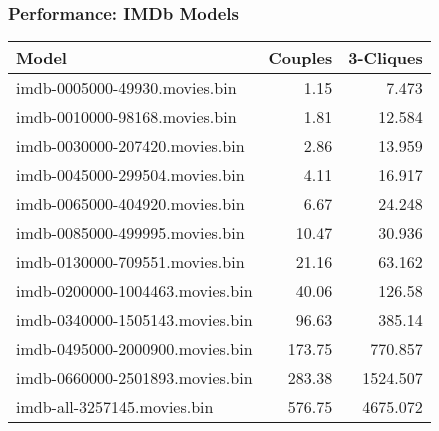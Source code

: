 \documentclass{beamer}
\begin{document}
\begin{frame}
  \frametitle{Performance: IMDb Models}
  \begin{table}
    \centering
    \begin{tabular}{| l | r | r |}
      \hline
      \textbf{Model}                  & \textbf{Couples} & \textbf{3-Cliques}\\
      \hline
      imdb-0005000-49930.movies.bin   & 1.15      & 7.473   \\
      imdb-0010000-98168.movies.bin   & 1.81      & 12.584  \\
      imdb-0030000-207420.movies.bin  & 2.86      & 13.959  \\
      imdb-0045000-299504.movies.bin  & 4.11      & 16.917  \\
      imdb-0065000-404920.movies.bin  & 6.67      & 24.248  \\
      imdb-0085000-499995.movies.bin  & 10.47     & 30.936  \\
      imdb-0130000-709551.movies.bin  & 21.16     & 63.162  \\
      imdb-0200000-1004463.movies.bin & 40.06     & 126.58  \\
      imdb-0340000-1505143.movies.bin & 96.63     & 385.14  \\
      imdb-0495000-2000900.movies.bin & 173.75    & 770.857 \\
      imdb-0660000-2501893.movies.bin & 283.38    & 1524.507\\
      imdb-all-3257145.movies.bin     & 576.75    & 4675.072\\
      \hline
    \end{tabular}
  \end{table}
\end{frame}
\end{document}
